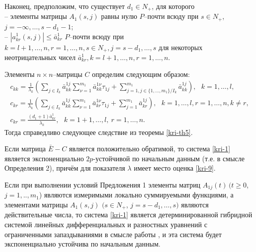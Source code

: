Наконец, предположим, что существует $d_1 \in N_+$, для которого\\
\noindent
  -- элементы матрицы $A_1(s,j)$ равны нулю $P$--почти всюду
при $ s \in N_+$, $j=-\infty,\dots,s-d_1-1$;\\
--
$|a^1_{kr}(s,j)| \leq \bar a^1_{kr}$ $P$--почти всюду при $ k = l+1,
\dots, n, r = 1,\dots,n, s\in N_+, j=s-d_1,\dots,s $ для некоторых
неотрицательных чисел $\bar a^1_{kr},k = l+1, \dots, n, r = 1,\dots,n$.

Элементы $n\times n$--матрицы $C$ определим следующим образом:
$$
\begin{array}{crl}
c_{kk} = \frac{1}{\lambda _k }\left(\sum \limits_{j \in I_k}\bar
a^{1j}_{kk}\sum \limits_{\nu=1}^{m_1}\bar a^{1\nu}_{kk} \tau _{1j} +
\sum \limits_{j=1, j \in \{1,\dots,m_1\}/ I_k}^{m_1} \bar
a^{1j}_{kk}\right), \ \ \ k = 1,\dots,l,\\
c_{kr} = \frac{1}{\lambda _k }\left(\sum \limits_{j \in I_k}\bar
a^{1j}_{kk}\sum \limits_{\nu=1}^{m_1}\bar a^{1\nu}_{kr}\tau _{1j} +
\sum \limits_{j=1}^{m_1} \bar a^{1j}_{kr}\right),\ \ \ k =
1,\dots,l,r = 1, \dots, n, k \neq r,\\
 c_{kr} = \frac{(d_1+1)\bar a^{1}_{kr}}{\lambda_k}, \ \ \ k = 1 + 1,\dots,l, \
 r = 1,\dots,n.
\end{array}
$$
Тогда справедливо следующее следствие из теоремы \ref{kri-th5}.

\begin{proposition}\label{kri-prop1}
Если матрица $\bar E - C$ является
положительно обратимой, то система \eqref{kri-1} является экспоненциально
$2p$-устойчивой по начальным данным (т.е. в смысле Определения 2),
причём для показателя  $\lambda$ имеет место оценка \eqref{kri-9}.
\end{proposition}
\begin{remark}\label{kri-rem1}  Если при выполнении условий Предложения 1
элементы матриц $A_{1j} (t) \, (t \geq 0$, $j = 1,..,m_1$) являются
измеримыми локально суммируемыми функциями, а элементами матрицы
$A_1(s,j)\,\, (s \in N_+$, $j=s-d_1, \dots, s)$ являются
действительные числа,  то система \eqref{kri-1} является детерминированной
гибридной системой линейных дифференциальных  и разностных уравнений
с ограниченными запаздываниями в смысле работы \cite{kri-5}, и эта
система будет экспоненциально устойчива по начальным данным.
\end{remark}

